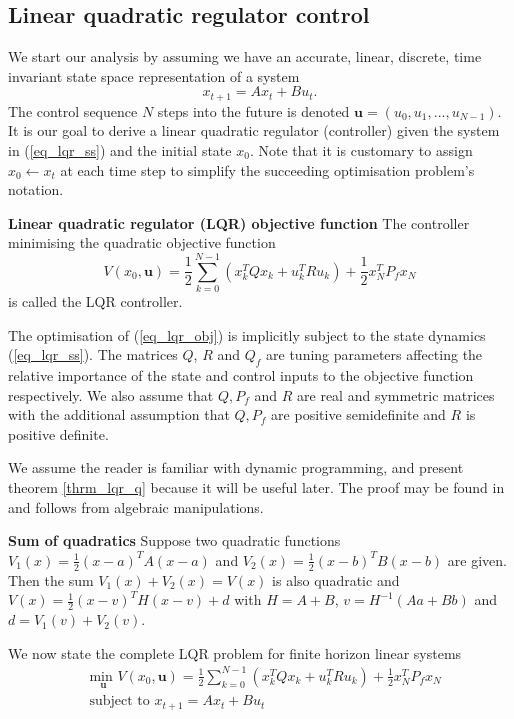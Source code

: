 \subsection{Linear quadratic regulator control}
\label{sec_lqr_lit}
We start our analysis by assuming we have an accurate, linear, discrete, time invariant state space representation of a system 
\begin{equation}
x_{t+1} = Ax_t+ Bu_t.
\label{eq_lqr_ss}
\end{equation}
The control sequence $N$ steps into the future is denoted $\mathbf{u}=(u_0, u_1,...,u_{N-1})$. It is our goal to derive a linear quadratic regulator (controller) given the system in (\ref{eq_lqr_ss}) and the initial state $x_0$. Note that it is customary to assign $x_0 \leftarrow x_t$ at each time step to simplify the succeeding optimisation problem's notation.
\begin{defn}
\textbf{Linear quadratic regulator (LQR) objective function} The controller minimising the quadratic objective function
\begin{equation}
V(x_0, \mathbf{u}) = \frac{1}{2}\sum_{k=0}^{N-1} \left( x_k^TQx_k + u_k^TRu_k \right) + \frac{1}{2}x_N^TP_fx_N
\label{eq_lqr_obj}
\end{equation}
is called the LQR controller.

The optimisation of (\ref{eq_lqr_obj}) is implicitly subject to the state dynamics (\ref{eq_lqr_ss}). The matrices $Q$, $R$ and $Q_f$ are tuning parameters affecting the relative importance of the state and control inputs to the objective function respectively. We also assume that $Q, P_f$ and $R$ are real and symmetric matrices with the additional assumption that $Q, P_f$ are positive semidefinite and $R$ is positive definite.
\label{def_lqr}
\end{defn}
We assume the reader is familiar with dynamic programming, and present theorem \ref{thrm_lqr_q} because it will be useful later. The proof may be found in \cite{raw} and follows from algebraic manipulations.
\begin{thrm}
\textbf{Sum of quadratics} Suppose two quadratic functions $V_1(x) = \frac{1}{2}(x-a)^TA(x-a)$ and $V_2(x) = \frac{1}{2}(x-b)^TB(x-b)$ are given. Then the sum $V_1(x) + V_2(x) = V(x)$ is also quadratic and $V(x) = \frac{1}{2}(x-v)^TH(x-v)+d$ with $H = A+B$, $v = H^{-1}(Aa+Bb)$ and $d = V_1(v) + V_2(v)$.
\label{thrm_lqr_q}
\end{thrm}
We now state the complete LQR problem for finite horizon linear systems\begin{equation}
\begin{aligned}
&\underset{\mathbf{u}}{\text{min }} V(x_0, \mathbf{u}) = \frac{1}{2}\sum_{k=0}^{N-1} \left( x_k^TQx_k + u_k^TRu_k \right) + \frac{1}{2}x_N^TP_fx_N \\
& \text{subject to } x_{t+1}=Ax_t+Bu_t
\end{aligned}
\label{eq_lqr_problem}
\end{equation}
